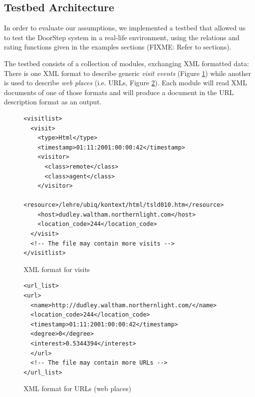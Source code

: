 \documentclass[a4paper]{danarticle}
\theoremstyle{remark}
\begin{document}
    \subsection{Testbed Architecture}
      In order to evaluate our assumptions, we implemented a testbed that 
      allowed us to test the DoorStep system in a real-life environment, using 
      the relations and rating functions given in the examples sections (FIXME: 
      Refer to sections).
      
      The testbed consists of a collection of modules, exchanging XML formatted 
      data: There is one XML format to describe generic \textit{visit events} 
      (Figure \ref{visitxml}) while another is used to describe \textit{web 
      places} (i.e. URLs, Figure \ref{urlxml}). Each module will read XML 
      documents of one of those formats and will produce a document in the URL 
      description format as an output.
      
      \begin{figure}[ht]
\begin{verbatim}
<visitlist>
  <visit>
    <type>Html</type>
    <timestamp>01:11:2001:00:00:42</timestamp>
    <visitor>
      <class>remote</class>
      <class>agent</class>
    </visitor>
    <resource>/lehre/ubiq/kontext/html/tsld010.htm</resource>
    <host>dudley.waltham.northernlight.com</host>
    <location_code>244</location_code>
  </visit>
  <!-- The file may contain more visits -->
</visitlist>
\end{verbatim}
        \caption{XML format for visits}
	\label{visitxml}
      \end{figure}
      \begin{figure}[ht]
\begin{verbatim}
<url_list>
<url>
  <name>http://dudley.waltham.northernlight.com/</name>
  <location_code>244</location_code>
  <timestamp>01:11:2001:00:00:42</timestamp>
  <degree>0</degree>
  <interest>0.5344394</interest>
  </url>
  <!-- The file may contain more URLs -->
</url_list>
\end{verbatim}
        \caption{XML format for URLs (web places)}
	\label{urlxml}
      \end{figure}
      
\end{document}
